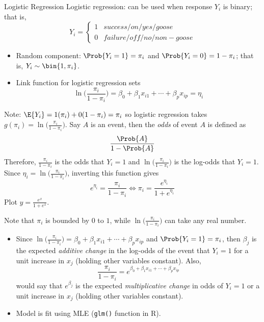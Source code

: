 \begin{Example}{Logistic Regression}{}
    Logistic regression: can be used when response $ Y_i $ is
    binary; that is,
    \[ Y_i =\begin{cases*}
            1 & success/on/yes/goose\\
            0 & failure/off/no/non-goose
        \end{cases*} \]
    \begin{itemize}
        \item Random component: $ \Prob{Y_i=1}=\pi_i $ and
              $ \Prob{Y_i=0}=1-\pi_i $; that is,
              $ Y_i \sim \bin{1,\pi_i} $.
        \item Link function for logistic regression sets
              \[ \ln\biggl(\frac{\pi_i}{1-\pi_i} \biggr)=
                  \beta_0+\beta_1x_{i1}+\cdots+\beta_p x_{i p}=\eta_i \]
    \end{itemize}
    Note: $ \E{Y_i}=1(\pi_i)+0(1-\pi_i)=\pi_i $ so logistic regression
    takes $ \displaystyle g(\pi_i)=\ln\biggl(\frac{\pi_i}{1-\pi_i}\biggr) $.
    Say $ A $ is an event, then the \emph{odds} of event $ A $ is defined as
    \[ \frac{\Prob{A}}{1-\Prob{A}} \]
    Therefore, $ \displaystyle \frac{\pi_i}{1-\pi_i} $ is the odds that
    $ Y_i=1 $ and $ \displaystyle \ln\biggl(\frac{\pi_i}{1-\pi_i}\biggr) $
    is the log-odds that $ Y_i=1 $. Since
    $ \displaystyle \eta_i=\ln\biggl(\frac{\pi_i}{1-\pi_i}\biggr) $,
    inverting this function gives
    \[ e^{\eta_i}=\frac{\pi_i}{1-\pi_i}\iff \pi_i=\frac{e^{\eta_i}}{1+e^{\eta_i}} \]
    Plot $ \displaystyle y=\frac{e^x}{1+e^x} $.

    Note that $ \pi_i $ is bounded by $ 0 $ to $ 1 $, while
    $ \displaystyle \ln\biggl(\frac{\pi_i}{1-\pi_i}\biggr) $
    can take any real number.
    \begin{itemize}
        \item Since $ \displaystyle \ln\biggl(\frac{\pi_i}{1-\pi_i}\biggr)=
                  \beta_0+\beta_1x_{i1}+\cdots+\beta_p x_{i p} $
              and $ \Prob{Y_i=1}=\pi_i $, then $ \beta_j $ is
              the expected \emph{additive change} in the log-odds of the event that $ Y_i=1 $
              for a unit increase in $ x_j $ (holding other variables constant).
              Also,
              \[ \frac{\pi_i}{1-\pi_i}=e^{\beta_0+\beta_1x_{i1}+\cdots+\beta_p x_{i p}}  \]
              would say that $ e^{\beta_j} $ is the expected \emph{multiplicative change}
              in odds of $ Y_i=1 $ or a unit increase in $ x_j $ (holding other variables constant).
        \item Model is fit using MLE (\texttt{glm()} function in R).
    \end{itemize}
\end{Example}
